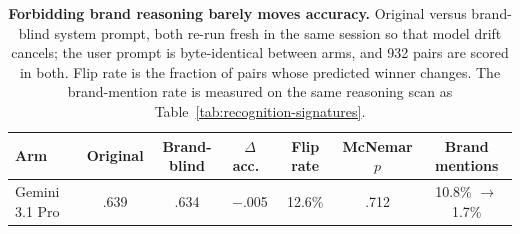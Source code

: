\begin{table}[t]
\centering
\footnotesize
\setlength{\tabcolsep}{5pt}
\renewcommand{\arraystretch}{0.95}
\caption{\textbf{Forbidding brand reasoning barely moves accuracy.} Original versus
brand-blind system prompt, both re-run fresh in the same session so that model drift
cancels; the user prompt is byte-identical between arms, and 932 pairs are scored
in both. Flip rate is the fraction of pairs whose predicted winner changes. The
brand-mention rate is measured on the same reasoning scan as
Table~\ref{tab:recognition-signatures}.}
\label{tab:brand-blind}
\begin{tabular}{@{}lcccccc@{}}
\toprule
Arm & Original & Brand-blind & $\Delta$ acc.\ & Flip rate & McNemar $p$ & Brand mentions \\
\midrule
Gemini 3.1 Pro & .639 & .634 & $-$.005 & 12.6\% & .712 & 10.8\% $\to$ 1.7\% \\
\bottomrule
\end{tabular}
\end{table}
